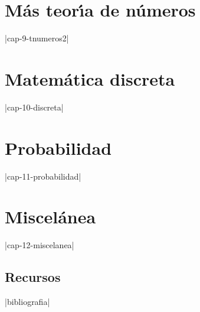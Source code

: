 \documentclass[landscape,10pt,oneside,oldfontcommands]{memoir} %
\begin{document}
\chapter{M\'as teor\'{\i}a de n\'umeros}
\monta|cap-9-tnumeros2|

\chapter{Matem\'atica discreta}\label{discr}
\monta|cap-10-discreta|




\chapter{Probabilidad}\label{prob}
\monta|cap-11-probabilidad|


\chapter{Miscel\'anea}
\monta|cap-12-miscelanea|





\begin{appendices}
\chapter{Recursos}
 \monta|bibliografia|
\end{appendices}
\end{document}
